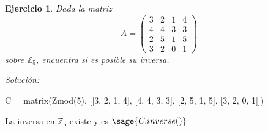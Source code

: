 \documentclass{amsart}
\newtheorem{ejer}{Ejercicio}
\def\z{\mathbb{Z}}
\begin{document}
\begin{ejer}
Dada la matriz 
\[ A =
	\left( \begin{array}{rrrr}
		3 & 2 & 1 & 4 \\
		4 & 4 & 3 & 3 \\
		2 & 5 & 1 & 5 \\
		3 & 2 & 0 & 1 
	\end{array}
	\right) 
	\]
sobre $\z _5$, encuentra si es posible su inversa.
\end{ejer}
{\it Soluci\'on:}

\begin{sageblock}
	C = matrix(Zmod(5), [[3, 2, 1, 4], [4, 4, 3, 3], [2, 5, 1, 5], [3, 2, 0, 1]])
\end{sageblock}

La inversa en $\z_5$ existe y es $\sage{C.inverse()}$


\end{document}
